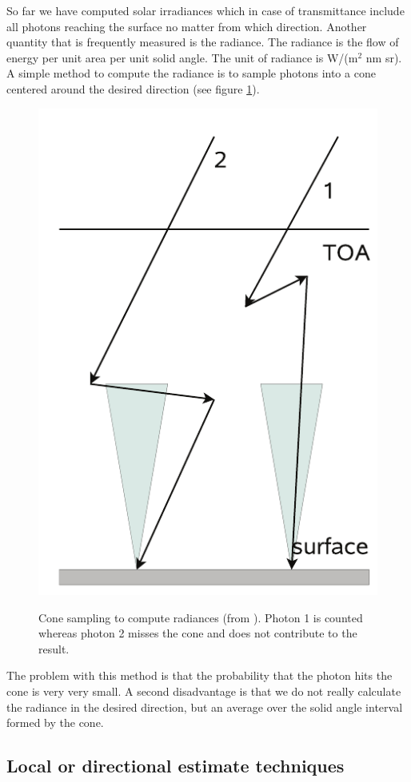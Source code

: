 \documentclass[12pt,twoside,a4paper]{article}
\begin{document}
So far we have computed solar irradiances which in case of
transmittance include all photons reaching the surface no matter from
which direction. 
Another quantity that is frequently measured is the radiance. The
radiance is the flow of energy per unit area per unit solid angle. The
unit of radiance is W/(m$^2$ nm sr). A simple method to compute the
radiance is to sample photons into a cone centered around the desired
direction (see figure \ref{fig:cone}). 
\begin{figure}[htbp]
  \centering
  \includegraphics[width=0.4\hsize]{./figs/cone_sampling.png}\\
  \caption{Cone sampling to compute radiances (from
    \citet{mayer2009}). Photon 1 is counted whereas photon 2 misses
    the cone and does not contribute to the result.}
  \label{fig:cone}
\end{figure}
The problem with this method is that the probability that the photon
hits the cone is very very small. A second disadvantage is that we do
not really calculate the radiance in the desired direction, but an
average over the solid angle interval formed by the cone. 


\subsection{Local or directional estimate techniques}
\end{document}
